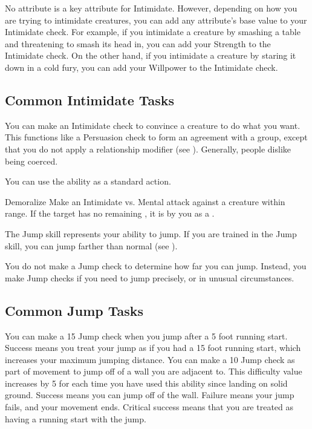         No attribute is a key attribute for Intimidate.
        However, depending on how you are trying to intimidate creatures, you can add any attribute's base value to your Intimidate check.
        For example, if you intimidate a creature by smashing a table and threatening to smash its head in, you can add your Strength to the Intimidate check.
        On the other hand, if you intimidate a creature by staring it down in a cold fury, you can add your Willpower to the Intimidate check.

    \subsection{Common Intimidate Tasks}
         You can make an Intimidate check to convince a creature to do what you want. This functions like a Persuasion check to form an agreement with a group, except that you do not apply a relationship modifier (see ).
        Generally, people dislike being coerced.

         You can use the  ability as a standard action.
        \begin{activeability}{Demoralize}
            \rankline
            Make an Intimidate vs. Mental attack against a creature within \rngmed range.
            \hit If the target has no remaining , it is \frightened by you as a .
        \end{activeability}

\newpage
{}
    The Jump skill represents your ability to jump.
    If you are trained in the Jump skill, you can jump farther than normal (see ).

    You do not make a Jump check to determine how far you can jump.
    Instead, you make Jump checks if you need to jump precisely, or in unusual circumstances.

    \subsection{Common Jump Tasks}
         You can make a  15 Jump check when you jump after a 5 foot running start.
        Success means you treat your jump as if you had a 15 foot running start, which increases your maximum jumping distance.
         You can make a  10 Jump check as part of movement to jump off of a wall you are adjacent to.
        This difficulty value increases by 5 for each time you have used this ability since landing on solid ground.
        Success means you can jump off of the wall.
        Failure means your jump fails, and your movement ends.
        Critical success means that you are treated as having a running start with the jump.

